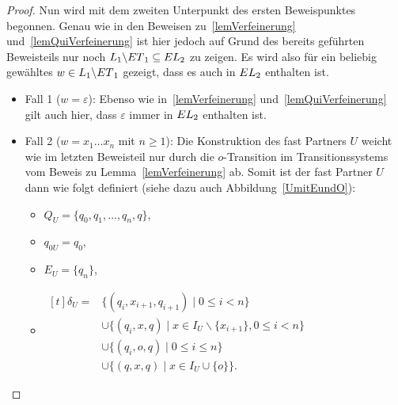 \begin{proof}
  Nun wird mit dem zweiten Unterpunkt des ersten Beweispunktes begonnen. Genau
  wie in den Beweisen zu~\ref{lemVerfeinerung} und~\ref{lemQuiVerfeinerung} ist
  hier jedoch auf Grund des bereits geführten Beweisteils nur noch
  $L_1\backslash ET{}_1\subseteq EL{}_2$ zu zeigen. Es wird also für ein
  beliebig gewähltes $w\in L_1\backslash ET{}_1$ gezeigt, dass es auch in
  $EL{}_2$ enthalten ist.
  \begin{itemize}
    \item Fall 1 ($w=\varepsilon$): Ebenso wie in~\ref{lemVerfeinerung}
      und~\ref{lemQuiVerfeinerung} gilt auch hier, dass $\varepsilon$ immer in
      $EL{}_2$ enthalten ist.
    \item Fall 2 ($w=x_1\dots x_n$ mit $n\geq 1$): Die Konstruktion des fast
      Partners $U$ weicht wie im letzten Beweisteil nur durch die
      $o$-Transition im Transitionssystems vom Beweis zu
      Lemma~\ref{lemVerfeinerung} ab. Somit ist der fast Partner $U$ dann wie
      folgt definiert (siehe dazu auch Abbildung~\ref{UmitEundO}):
      \begin{itemize}
        \item $Q_U=\{q_0,q_1,\dots ,q_n,q\}$,
        \item $q_{0U}=q_0$,
        \item $E_U=\{q_n\}$,
        \item $\begin{aligned}[t]
            \delta _U=&\{(q_i,x_{i+1},q_{i+1})\mid 0\leq i< n\}\\
                      &\cup\{(q_i,x,q)\mid x\in I_U\backslash\{x_{i+1}\},0\leq
          i < n\}\\
          &\cup\{(q_i,o ,q)\mid 0\leq i\leq n\}\\
          &\cup\{(q,x ,q)\mid x\in I_U\cup \{o\}\}.
              \end{aligned}$
      \end{itemize}
      \begin{figure} [h!tbp]
      \begin{center}
\end{center}
\end{figure}
\end{itemize}
\end{proof}
